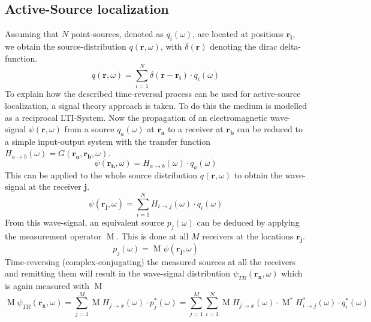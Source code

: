 \subsection{Active-Source localization}
Assuming that \(N\) point-sources, denoted as \(q_i(\omega)\), are located at positions \(\mathbf{r_i}\), we obtain the source-distribution \(q(\mathbf{r}, \omega)\), with \(\delta(\mathbf{r}) \) denoting the dirac delta-function.
\begin{equation}
    q(\mathbf{r}, \omega) = \sum_{i=1}^{N} \delta(\mathbf{r} - \mathbf{r_i}) \cdot q_i(\omega)
\end{equation}
To explain how the described time-reversal process can be used for active-source localization, a signal theory approach is taken.
To do this the medium is modelled as a reciprocal LTI-System.
Now the propagation of an electromagnetic wave-signal \(\psi(\mathbf{r}, \omega )\) from a source \(q_a(\omega )\) at \(\mathbf{r_a}\) to a receiver at \(\mathbf{r_b}\) can be reduced to a simple input-output system with the transfer function \(H_{a\rightarrow b}(\omega) = G(\mathbf{r_a}, \mathbf{r_b}, \omega)\).
\begin{equation}
    \psi(\mathbf{r_b}, \omega) = H_{a\rightarrow b}(\omega) \cdot q_a(\omega)
\end{equation}
This can be applied to the whole source distribution \(q(\mathbf{r}, \omega)\) to obtain the wave-signal at the receiver \(\mathbf{j}\).
\begin{equation}
    \psi(\mathbf{r_j}, \omega) = \sum_{i=1}^{N} H_{i\rightarrow j}(\omega) \cdot q_i(\omega)
\end{equation}
From this wave-signal, an equivalent source \(p_j(\omega)\) can be deduced by applying the measurement operator \(\operatorname{M}\). This is done at all \(M\) receivers at the locations \(\mathbf{r_j}\).  
\begin{equation}
    p_j(\omega) = \operatorname{M} \psi(\mathbf{r_j}, \omega)
\end{equation}
Time-reversing (complex-conjugating) the measured sources at all the receivers and remitting them will result in the wave-signal distribution \(\psi_{TR}(\mathbf{r_x}, \omega)\) which is again measured with \(\operatorname{M}\)
\begin{equation}\label{signal-time-reversal}
    \operatorname{M} \psi_{TR}(\mathbf{r_x}, \omega) = \sum_{j=1}^{M} \operatorname{M} H_{j\rightarrow x}(\omega ) \cdot p_j^*(\omega) = \sum_{j=1}^{M} \sum_{i=1}^{N} \operatorname{M} H_{j\rightarrow x}(\omega) \cdot \operatorname{M}^* H^*_{i\rightarrow j}(\omega) \cdot q^*_i(\omega)
\end{equation}
